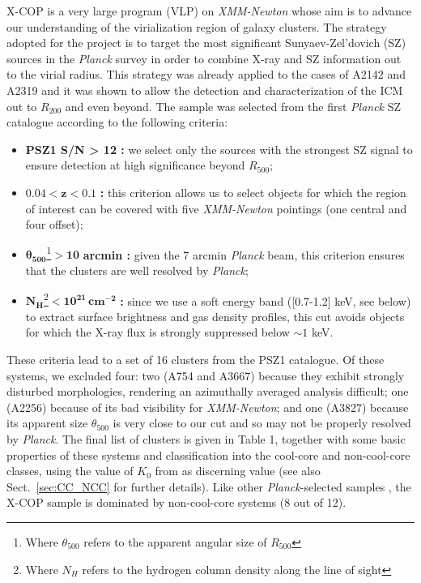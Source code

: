 \documentclass[traditabstract   ]{aa} %
\newcommand{\planck}{{\it Planck}}
\begin{document}
X-COP \citep{xcop} is a very large program (VLP) on \emph{XMM-Newton} whose  aim is to advance our understanding of the virialization region of galaxy clusters. The strategy adopted for the project is to target the most significant Sunyaev-Zel'dovich (SZ) sources in the \emph{Planck} survey in order to combine X-ray and SZ information out to the virial radius. This strategy was already applied to the cases of A2142 \citep{tchernin16} and A2319 \citep{ghirardini18} and it was shown to allow the detection and characterization of the ICM out to $R_{200}$ and even beyond. The sample was selected from the first \emph{Planck} SZ catalogue \citep[PSZ1,][]{psz1} according to the following criteria:
\begin{itemize}
 \item \textbf{PSZ1 S/N > 12 :} we select only the sources with the strongest SZ signal to ensure detection at high significance beyond $R_{500}$;
 \item $\mathbf{0.04<z<0.1}$ \textbf{:} this criterion allows us to select objects for which the region of interest can be covered with five \emph{XMM-Newton} pointings (one central and four offset);
 \item $\mathbf{\theta_{500}}$\footnote{Where $\theta_{500}$ refers to the apparent angular size of $R_{500}$}$\mathbf{>10}$ \textbf{arcmin :} given the 7 arcmin \emph{Planck} beam, this criterion ensures that the clusters are well resolved by \emph{Planck};
 \item $\mathbf{N_H}$\footnote{Where ${N_H}$ refers to the hydrogen column density along the line of sight}$\mathbf{<10^{21}\, cm^{-2}}$ \textbf{:}  since we use a soft energy band ([0.7-1.2] keV, see below) to extract surface brightness and gas density profiles, this cut avoids objects for which the X-ray flux is strongly suppressed below $\sim1$ keV.
 \end{itemize}
 
 These criteria lead to a set of 16 clusters from the PSZ1 catalogue. Of these systems, we excluded four: two  (A754 and A3667) because they exhibit strongly disturbed morphologies, rendering an azimuthally averaged analysis difficult; one (A2256)  because of its bad visibility for \emph{XMM-Newton}; and one (A3827) because its apparent size $\theta_{500}$ is very close to our cut and so may not be properly resolved by \emph{Planck}. 
 The final list of clusters is given in Table 1, together with some basic properties of these systems and classification into the cool-core and non-cool-core classes{, using the value of $K_0$ from \cite{cavagnolo+09} as discerning value (see also Sect.~\ref{sec:CC_NCC} for further details).} Like other \planck-selected samples \citep{rossetti17,andrade-santos17,lovisari17}, the X-COP sample is dominated by non-cool-core systems (8 out of 12).
 
\end{document}
